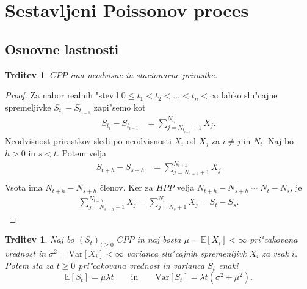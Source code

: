 \documentclass[12pt, a4paper, reqno]{amsart}
\theoremstyle{definition} %
\theoremstyle{plain} %
\newtheorem{trditev}[definicija]{Trditev}
\newcommand{\E}{\mathbb{E}}
\newcommand{\1}{\mathds{1}}
\newcommand{\Var}[1]{\text{Var}\left[#1\right]}
\begin{document}
\section{Sestavljeni Poissonov proces}

    \begin{center}
    \end{center}

    \subsection{Osnovne lastnosti}

        \begin{trditev}
            $CPP$ ima neodvisne in stacionarne prirastke.
            \label{trd:neodvPrirCPP}
        \end{trditev}

        \begin{proof}
            Za nabor realnih "stevil $0 \leq t_1 < t_2 < \ldots < t_n < \infty$ lahko slu"cajne
            spremeljivke $S_{t_i} - S_{t_{i-1}}$ zapi"semo kot
            \begin{align*}
                S_{t_i} - S_{t_{i-1}} &= \sum_{j=N_{t_{i-1}}+1}^{N_{t_i}} X_j. 
            \end{align*}
            Neodvisnost prirastkov sledi po neodvisnosti $X_i$ od $X_j$ za $i\neq j$ in $N_t$. 
            Naj bo $h > 0$ in $s < t$. Potem velja
            \begin{align*}
                S_{t+h} - S_{s+h} &= \sum_{j=N_{s+h}+1}^{N_{t+h}} X_j \\
            \end{align*}
            Vsota ima $N_{t+h} - N_{s+h}$ členov. Ker za $HPP$ velja 
            $N_{t+h} - N_{s+h} \sim N_t - N_s$, je 
            \begin{align*}
                \sum_{j=N_{s+h}+1}^{N_{t+h}} X_j = \sum_{j=N_{s}+1}^{N_{t}} X_j = S_t - S_s.
            \end{align*}
        \end{proof}

        \begin{trditev}
            Naj bo $(S_t)_{t\geq 0}$ $CPP$ in naj bosta $\mu = \E\left[X_i\right] < \infty$ 
            pri"cakovana vrednost in $\sigma^2= \Var{X_i} <\infty$ varianca
            slu"cajnih spremenljivk $X_i$ za vsak $i$. Potem sta za $t\geq0$ pri"cakovana vrednost in 
            varianca $S_t$ enaki 
            \begin{equation*}
                \E\left[S_t\right] = \mu\lambda t \qquad \text{in} \qquad \Var{S_t} = \lambda t\left(\sigma^2 + \mu^2\right).
            \end{equation*}
            \label{trd:PricVarCPP}
        \end{trditev}
\end{document}

